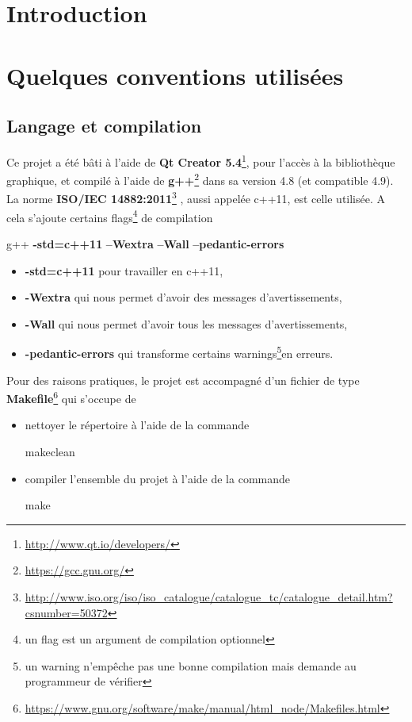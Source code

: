 \documentclass[a4paper,11pt]{report}
\begin{document}

\tableofcontents

\chapter{Introduction}



\chapter[Conventions]{Quelques conventions utilisées}
\section{Langage et compilation}
Ce projet a été bâti à l'aide de \textbf{Qt Creator
5.4}\footnote{\url{http://www.qt.io/developers/}}, pour l'accès à la bibliothèque
graphique, et compilé à l'aide de
\textbf{g++}\footnote{\url{https://gcc.gnu.org/}} dans sa version 4.8 (et
compatible 4.9). La norme \textbf{ISO/IEC
14882:2011}\footnote{\url{http://www.iso.org/iso/iso_catalogue/catalogue_tc/catalogue_detail.htm?csnumber=50372}}
, aussi appelée c++11, est celle
utilisée. A cela s'ajoute certains flags\footnote{un flag est un argument de
compilation optionnel} de compilation
\begin{center}
	g++
	\textbf{-std=c++11}\textvisiblespace
	\textbf{--Wextra}\textvisiblespace
	\textbf{--Wall}\textvisiblespace
	\textbf{--pedantic-errors}
\end{center}
\begin{itemize}
	\item \textbf{-std=c++11} pour travailler en c++11,
	\item \textbf{-Wextra} qui nous permet d'avoir des messages d'avertissements,
	\item \textbf{-Wall} qui nous permet d'avoir tous les messages d'avertissements,
	\item \textbf{-pedantic-errors} qui transforme certains warnings\footnote{un
			warning n'empêche pas une bonne compilation mais demande au
		programmeur de vérifier}en erreurs. \\
\end{itemize}
Pour des raisons pratiques, le projet est accompagné d'un fichier de type
\textbf{Makefile}\footnote{\url{https://www.gnu.org/software/make/manual/html_node/Makefiles.html}}
qui s'occupe de
\begin{itemize}
	\item nettoyer le répertoire à l'aide de la commande 
		\begin{center}
			make\textvisiblespace clean
		\end{center}
	\item compiler l'ensemble du projet à l'aide de la commande
		\begin{center}
			make
		\end{center}
\end{itemize}
\newpage
\end{document}
